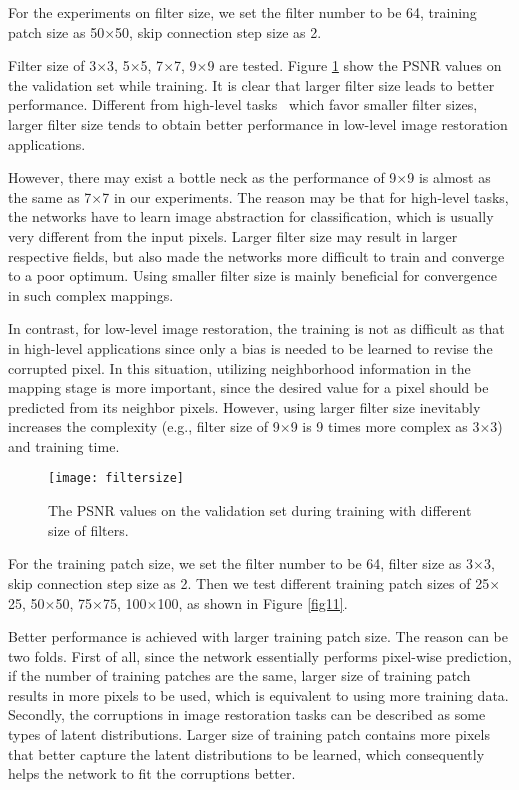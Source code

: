 For the experiments on filter size, we set the filter number to be 64, training patch
size as 50$\times$50, skip connection step size as 2.

Filter size of 3$\times$3,
5$\times$5, 7$\times$7, 9$\times$9 are tested. Figure \ref{fig10} show the PSNR values
on the validation set while training. It is clear that larger filter size leads to
better performance. Different from high-level tasks~\cite{DBLP:conf/eccv/ZeilerF14,
DBLP:journals/corr/SermanetEZMFL13,DBLP:journals/corr/SimonyanZ14a} which favor smaller
filter sizes, larger filter size tends to obtain better performance in low-level image
restoration applications.

However, there  may  exist a bottle neck  as  the performance
of 9$\times$9 is almost as the same as 7$\times$7 in our experiments. The reason may be
that for high-level tasks, the networks have to learn image abstraction for classification, which is usually
very different from the input pixels. Larger filter size may result in larger respective fields,
but also made the networks more difficult to train and converge to a poor optimum. Using
smaller filter size is mainly beneficial for convergence in such complex mappings.

In contrast, for low-level image restoration, the training is not as difficult as that in high-level
applications since only a bias is needed to be learned to revise the corrupted pixel.
In this situation, utilizing neighborhood information in the mapping stage is more important,
since the desired value for a pixel should be predicted from its neighbor pixels.
However, using larger filter size inevitably increases the complexity (e.g., filter
size of 9$\times$9 is 9 times more complex as 3$\times$3) and training time.

\begin{figure}[t!]
\centering
\texttt{[image: filtersize]}
\caption{The PSNR values on the validation set during training with different size of filters.}
\label{fig10}
\end{figure}

For the training patch size, we set the filter number to be 64, filter size as 3$\times$3,
skip connection step size as 2. Then we test different training patch sizes of 25$\times$25,
50$\times$50, 75$\times$75, 100$\times$100, as shown in Figure \ref{fig11}.

Better
performance is achieved with larger training patch size. The reason can be two folds.
First of all, since the network essentially performs pixel-wise prediction, if the number
of training patches are the same, larger size of training patch results in more pixels
to be used, which is equivalent to using more training data. Secondly, the corruptions
in image restoration tasks can be described as some types of latent distributions. Larger
size of training patch contains more pixels that better capture the latent distributions
to be learned, which consequently helps the network to fit the corruptions better.

